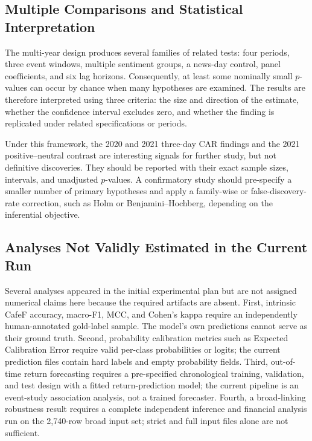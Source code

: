 \documentclass[12pt,a4paper]{article}
\begin{document}
\subsection{Multiple Comparisons and Statistical Interpretation}
\label{subsec:multiple-comparisons}

The multi-year design produces several families of related tests: four periods, three event windows, multiple sentiment groups, a news-day control, panel coefficients, and six lag horizons. Consequently, at least some nominally small $p$-values can occur by chance when many hypotheses are examined. The results are therefore interpreted using three criteria: the size and direction of the estimate, whether the confidence interval excludes zero, and whether the finding is replicated under related specifications or periods.

Under this framework, the 2020 and 2021 three-day CAR findings and the 2021 positive--neutral contrast are interesting signals for further study, but not definitive discoveries. They should be reported with their exact sample sizes, intervals, and unadjusted $p$-values. A confirmatory study should pre-specify a smaller number of primary hypotheses and apply a family-wise or false-discovery-rate correction, such as Holm or Benjamini--Hochberg, depending on the inferential objective.

\subsection{Analyses Not Validly Estimated in the Current Run}
\label{subsec:deferred-analyses-multi-year}

Several analyses appeared in the initial experimental plan but are not assigned numerical claims here because the required artifacts are absent. First, intrinsic CafeF accuracy, macro-F1, MCC, and Cohen's kappa require an independently human-annotated gold-label sample. The model's own predictions cannot serve as their ground truth. Second, probability calibration metrics such as Expected Calibration Error require valid per-class probabilities or logits; the current prediction files contain hard labels and empty probability fields. Third, out-of-time return forecasting requires a pre-specified chronological training, validation, and test design with a fitted return-prediction model; the current pipeline is an event-study association analysis, not a trained forecaster. Fourth, a broad-linking robustness result requires a complete independent inference and financial analysis run on the 2,740-row broad input set; strict and full input files alone are not sufficient.
\end{document}

